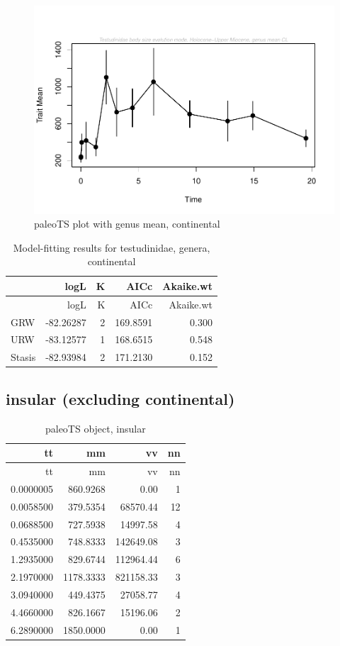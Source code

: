 \newpage

\begin{figure}[H]
	\centering
	\includegraphics{MA_JJ_files/figure-latex/paleoTSC-1.pdf}
	\caption{paleoTS plot with genus mean, continental}
	\label{fig:pTSC}
\end{figure}

\begin{longtable}[]{@{}lrrrr@{}}
	\caption{Model-fitting results for testudinidae, genera,
		continental}
	\label{tab:pTSCEM}\tabularnewline
	\toprule
	& logL & K & AICc & Akaike.wt\tabularnewline
	\midrule
	\endfirsthead
	\toprule
	& logL & K & AICc & Akaike.wt\tabularnewline
	\midrule
	\endhead
	GRW & -82.26287 & 2 & 169.8591 & 0.300\tabularnewline
	URW & -83.12577 & 1 & 168.6515 & 0.548\tabularnewline
	Stasis & -82.93984 & 2 & 171.2130 & 0.152\tabularnewline
	\bottomrule
\end{longtable}


\FloatBarrier

\subsection{insular (excluding
	continental)}\label{insular-excluding-continental}


\begin{longtable}[]{@{}rrrr@{}}
	\caption{paleoTS object, insular}
	\label{tab:pTSI}\tabularnewline
	\toprule
	tt & mm & vv & nn\tabularnewline
	\midrule
	\endfirsthead
	\toprule
	tt & mm & vv & nn\tabularnewline
	\midrule
	\endhead
	0.0000005 & 860.9268 & 0.00 & 1\tabularnewline
	0.0058500 & 379.5354 & 68570.44 & 12\tabularnewline
	0.0688500 & 727.5938 & 14997.58 & 4\tabularnewline
	0.4535000 & 748.8333 & 142649.08 & 3\tabularnewline
	1.2935000 & 829.6744 & 112964.44 & 6\tabularnewline
	2.1970000 & 1178.3333 & 821158.33 & 3\tabularnewline
	3.0940000 & 449.4375 & 27058.77 & 4\tabularnewline
	4.4660000 & 826.1667 & 15196.06 & 2\tabularnewline
	6.2890000 & 1850.0000 & 0.00 & 1\tabularnewline
	\bottomrule
\end{longtable}

